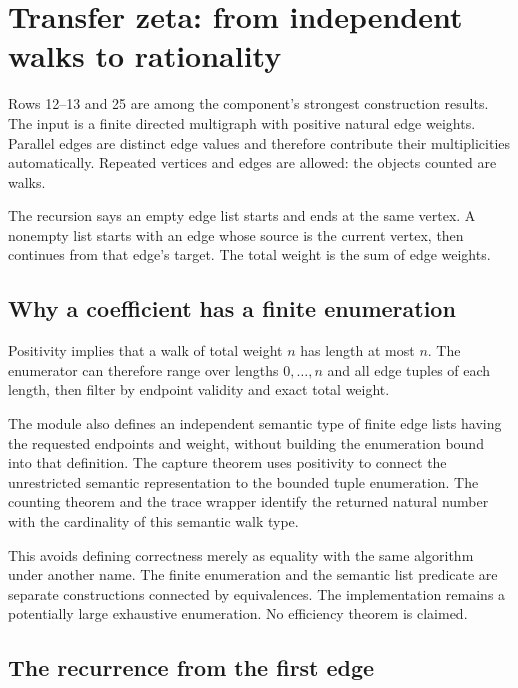 \section{Transfer zeta: from independent walks to rationality}\label{sec:zeta}

Rows 12--13 and 25 are among the component's strongest construction results. The input is a finite directed multigraph with positive natural edge weights. Parallel edges are distinct edge values and therefore contribute their multiplicities automatically. Repeated vertices and edges are allowed: the objects counted are walks.

The recursion  says an empty edge list starts and ends at the same vertex. A nonempty list starts with an edge whose source is the current vertex, then continues from that edge's target. The total weight is the sum of edge weights.

\subsection{Why a coefficient has a finite enumeration}

Positivity implies that a walk of total weight $n$ has length at most $n$. The enumerator can therefore range over lengths $0,\ldots,n$ and all edge tuples of each length, then filter by endpoint validity and exact total weight.

The module also defines an independent semantic type of finite edge lists having the requested endpoints and weight, without building the enumeration bound into that definition. The capture theorem uses positivity to connect the unrestricted semantic representation to the bounded tuple enumeration. The counting theorem and the trace wrapper identify the returned natural number with the cardinality of this semantic walk type.

This avoids defining correctness merely as equality with the same algorithm under another name. The finite enumeration and the semantic list predicate are separate constructions connected by equivalences. The implementation remains a potentially large exhaustive enumeration. No efficiency theorem is claimed.

\subsection{The recurrence from the first edge}

